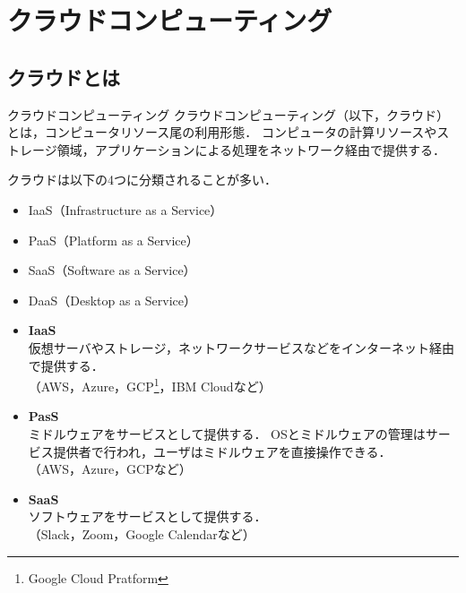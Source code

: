 \section{クラウドコンピューティング}
\tocc
\subsection{クラウドとは}
\begin{frame}[t]{\ftitle}
    \begin{block}{クラウドコンピューティング}
        クラウドコンピューティング（以下，クラウド）とは，コンピュータリソース尾の利用形態．
        コンピュータの計算リソースやストレージ領域，アプリケーションによる処理をネットワーク経由で提供する．\hfill\cite{2015amazon}
    \end{block}
    クラウドは以下の4つに分類されることが多い．
    \begin{itemize}
        \setlength{\itemsep}{1em}
        \item IaaS（Infrastructure as a Service）
        \item PaaS（Platform as a Service）
        \item SaaS（Software as a Service）
        \item DaaS（Desktop as a Service）%
    \end{itemize}
\end{frame}
\begin{frame}[t]{\ftitle}
    \begin{itemize}
        \item \textbf{IaaS}\\
              仮想サーバやストレージ，ネットワークサービスなどをインターネット経由で提供する．\\（AWS，Azure，GCP\footnote{Google Cloud Pratform}，IBM Cloudなど）
        \item \textbf{PasS}\\
              ミドルウェアをサービスとして提供する．
              OSとミドルウェアの管理はサービス提供者で行われ，ユーザはミドルウェアを直接操作できる．\\（AWS，Azure，GCPなど）
        \item \textbf{SaaS}\\
              ソフトウェアをサービスとして提供する．\\（Slack，Zoom，Google Calendarなど）
    \end{itemize}
    \hfill\cite{2015amazon}
\end{frame}
